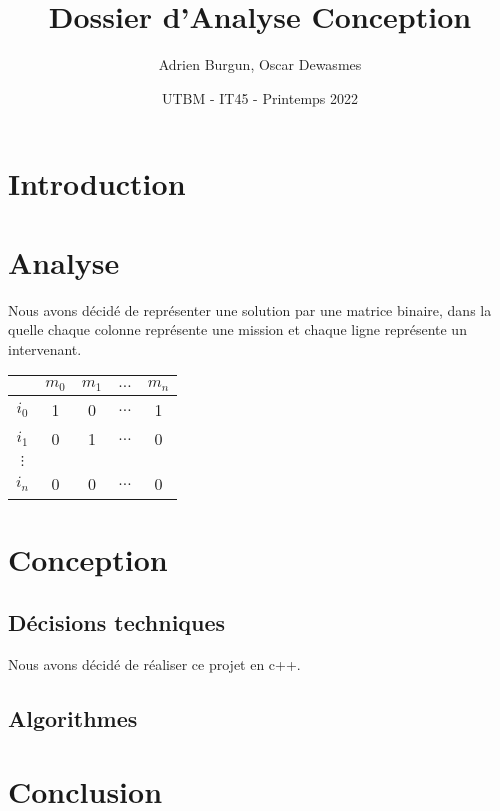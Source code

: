 \documentclass[11pt]{article}
\title{\textbf{Dossier d'Analyse Conception}}
\author{Adrien Burgun, Oscar Dewasmes}
\date{UTBM - IT45 - Printemps 2022} %
\begin{document}
\maketitle


\newpage
\tableofcontents


\newpage
\section{Introduction}


\newpage
\section{Analyse}

Nous avons décidé de représenter une solution par une matrice binaire, dans la quelle chaque colonne représente une mission et chaque ligne représente un intervenant.

\begin{center}
\begin{tabular}{|c|c|c|c|c|}
    & $m_0$ & $m_1$ & $\hdots$ & $m_n$ \\\hline
    $i_0$ & 1 & 0 & $\hdots$ & 1 \\\hline
    $i_1$ & 0 & 1 & $\hdots$ & 0 \\\hline
    $\vdots$ & & & & \\\hline
    $i_n$ & 0 & 0 & $\hdots$ & 0 \\\hline
\end{tabular}
\end{center}




\newpage
\section{Conception}
\subsection{Décisions techniques}

Nous avons décidé de réaliser ce projet en c++.


\subsection{Algorithmes}










\newpage
\section{Conclusion}
\end{document}

